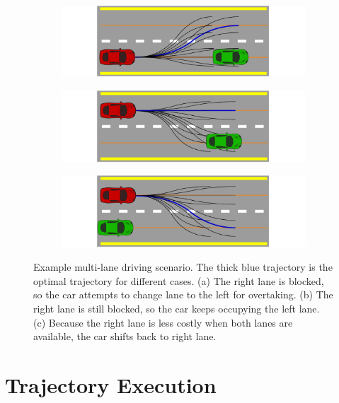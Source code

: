\begin{figure}[h]
  \centering
  \begin{subfigure}[b]{1.0\linewidth}
    \includegraphics[width=\linewidth]{figures/frenet-shift-left-lane.pdf}
    \caption{}
  \end{subfigure}
  \begin{subfigure}[b]{1.0\linewidth}
    \includegraphics[width=\linewidth]{figures/frenet-keep-left-lane.pdf}
    \caption{}
  \end{subfigure}
  \begin{subfigure}[b]{1.0\linewidth}
    \includegraphics[width=\linewidth]{figures/frenet-shift-right-lane.pdf}
    \caption{}
  \end{subfigure}
  \caption{Example multi-lane driving scenario. The thick blue trajectory is
    the optimal trajectory for different cases. (a) The right lane is
    blocked, so the car attempts to change lane to the left for overtaking.
    (b) The right lane is still blocked, so the car keeps occupying the left
    lane. (c) Because the right lane is less costly when both lanes are
    available, the car shifts back to right lane.}
  \label{figure:frenet-lanes}
\end{figure}

\section{Trajectory Execution}

